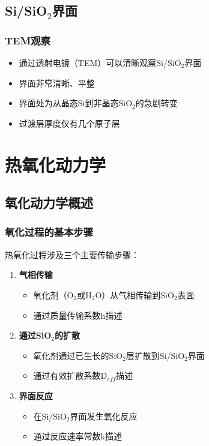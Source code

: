 \documentclass[UTF8,12pt,a4paper]{ctexart}
\begin{document}
\subsection{Si/SiO$_2$界面}

\subsubsection{TEM观察}

\begin{itemize}
    \item 通过透射电镜（TEM）可以清晰观察Si/SiO$_2$界面
    \item 界面非常清晰、平整
    \item 界面处为从晶态Si到非晶态SiO$_2$的急剧转变
    \item 过渡层厚度仅有几个原子层
\end{itemize}
\newpage
\section{热氧化动力学}

\subsection{氧化动力学概述}

\subsubsection{氧化过程的基本步骤}

热氧化过程涉及三个主要传输步骤：

\begin{enumerate}
    \item \textbf{气相传输}
    \begin{itemize}
        \item 氧化剂（O$_2$或H$_2$O）从气相传输到SiO$_2$表面
        \item 通过质量传输系数h描述
    \end{itemize}
    
    \item \textbf{通过SiO$_2$的扩散}
    \begin{itemize}
        \item 氧化剂通过已生长的SiO$_2$层扩散到Si/SiO$_2$界面
        \item 通过有效扩散系数D$_{eff}$描述
    \end{itemize}
    
    \item \textbf{界面反应}
    \begin{itemize}
        \item 在Si/SiO$_2$界面发生氧化反应
        \item 通过反应速率常数k描述
    \end{itemize}
\end{enumerate}
\end{document}
